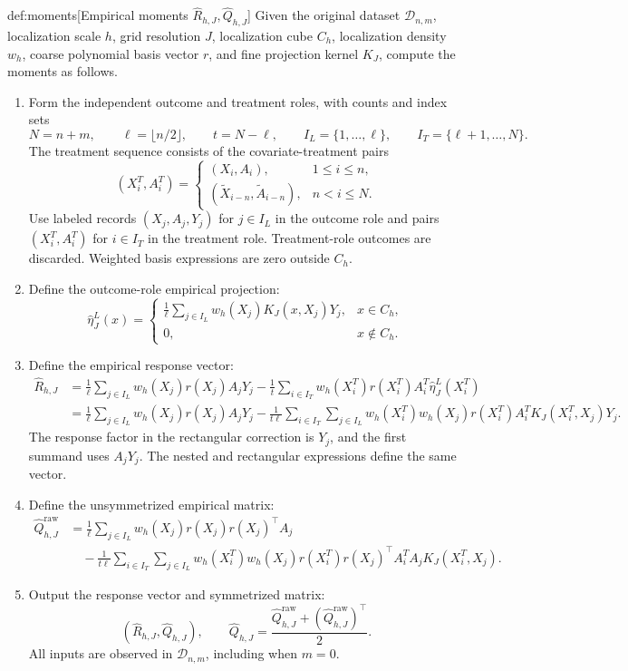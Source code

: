 \documentclass[11pt]{article}
\begin{document}
\begin{algorithmv}{def:moments}[Empirical moments \(\widehat R_{h,J},\widehat Q_{h,J}\)]
Given the original dataset \(\mathcal D_{n,m}\), localization scale \(h\), grid resolution \(J\), localization cube \(C_h\), localization density \(w_h\), coarse polynomial basis vector \(r\), and fine projection kernel \(K_J\), compute the moments as follows.
\begin{enumerate}
\item Form the independent outcome and treatment roles, with counts and index sets
\[
N=n+m,\qquad
\ell=\lfloor n/2\rfloor,\qquad
t=N-\ell,\qquad
I_L=\{1,\ldots,\ell\},\qquad
I_T=\{\ell+1,\ldots,N\}.
\]
The treatment sequence consists of the covariate-treatment pairs
\[
(X_i^T,A_i^T)=
\begin{cases}
(X_i,A_i),&1\le i\le n,\\
(\widetilde X_{i-n},\widetilde A_{i-n}),&n<i\le N.
\end{cases}
\]
Use labeled records \((X_j,A_j,Y_j)\) for \(j\in I_L\) in the outcome role and pairs \((X_i^T,A_i^T)\) for \(i\in I_T\) in the treatment role. Treatment-role outcomes are discarded. Weighted basis expressions are zero outside \(C_h\).
\item Define the outcome-role empirical projection:
\[
\widehat\eta_J^L(x)=
\begin{cases}
\displaystyle\frac1\ell\sum_{j\in I_L}
w_h(X_j)K_J(x,X_j)Y_j,&x\in C_h,\\
0,&x\notin C_h.
\end{cases}
\]
\item Define the empirical response vector:
\[
\begin{aligned}
\widehat R_{h,J}
&=\frac1\ell\sum_{j\in I_L}w_h(X_j)r(X_j)A_jY_j
-\frac1t\sum_{i\in I_T}w_h(X_i^T)r(X_i^T)A_i^T
\widehat\eta_J^L(X_i^T)\\
&=\frac1\ell\sum_{j\in I_L}w_h(X_j)r(X_j)A_jY_j
-\frac1{t\ell}\sum_{i\in I_T}\sum_{j\in I_L}
w_h(X_i^T)w_h(X_j)r(X_i^T)A_i^T
K_J(X_i^T,X_j)Y_j.
\end{aligned}
\]
The response factor in the rectangular correction is \(Y_j\), and the first summand uses \(A_jY_j\). The nested and rectangular expressions define the same vector.
\item Define the unsymmetrized empirical matrix:
\[
\begin{aligned}
\widehat Q^{\mathrm{raw}}_{h,J}
&=\frac1\ell\sum_{j\in I_L}w_h(X_j)r(X_j)r(X_j)^\top A_j\\
&\quad-\frac1{t\ell}\sum_{i\in I_T}\sum_{j\in I_L}
w_h(X_i^T)w_h(X_j)r(X_i^T)r(X_j)^\top
A_i^TA_jK_J(X_i^T,X_j).
\end{aligned}
\]
\item Output the response vector and symmetrized matrix:
\[
\left(\widehat R_{h,J},\widehat Q_{h,J}\right),
\qquad
\widehat Q_{h,J}
=\frac{\widehat Q^{\mathrm{raw}}_{h,J}
+(\widehat Q^{\mathrm{raw}}_{h,J})^\top}{2}.
\]
All inputs are observed in \(\mathcal D_{n,m}\), including when \(m=0\).
\end{enumerate}
\end{algorithmv}
\end{document}
